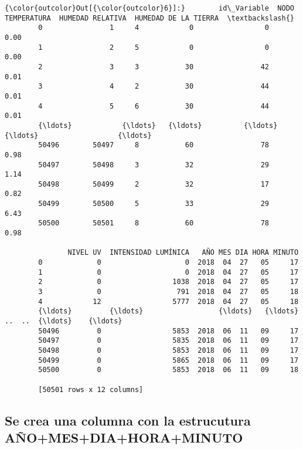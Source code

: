 \documentclass[11pt]{article}
\begin{document}
\begin{Verbatim}[commandchars=\\\{\}]
{\color{outcolor}Out[{\color{outcolor}6}]:}        id\_Variable  NODO  TEMPERATURA  HUMEDAD RELATIVA  HUMEDAD DE LA TIERRA  \textbackslash{}
        0                1     4            0                 0                  0.00   
        1                2     5            0                 0                  0.00   
        2                3     3           30                42                  0.01   
        3                4     2           30                44                  0.01   
        4                5     6           30                44                  0.01   
        {\ldots}            {\ldots}   {\ldots}          {\ldots}               {\ldots}                   {\ldots}   
        50496        50497     8           60                78                  0.98   
        50497        50498     3           32                29                  1.14   
        50498        50499     2           32                17                  0.82   
        50499        50500     5           33                29                  6.43   
        50500        50501     8           60                78                  0.98   
        
               NIVEL UV  INTENSIDAD LUMÍNICA   AÑO MES DIA HORA MINUTO  
        0             0                    0  2018  04  27   05     17  
        1             0                    0  2018  04  27   05     17  
        2             0                 1038  2018  04  27   05     17  
        3             0                  791  2018  04  27   05     18  
        4            12                 5777  2018  04  27   05     18  
        {\ldots}         {\ldots}                  {\ldots}   {\ldots}  ..  ..  {\ldots}    {\ldots}  
        50496         0                 5853  2018  06  11   09     17  
        50497         0                 5835  2018  06  11   09     17  
        50498         0                 5853  2018  06  11   09     17  
        50499         0                 5865  2018  06  11   09     17  
        50500         0                 5853  2018  06  11   09     18  
        
        [50501 rows x 12 columns]
\end{Verbatim}
            
    \subsection{Se crea una columna con la estrucutura
AÑO+MES+DIA+HORA+MINUTO}\label{se-crea-una-columna-con-la-estrucutura-auxf1omesdiahoraminuto}
\end{document}
